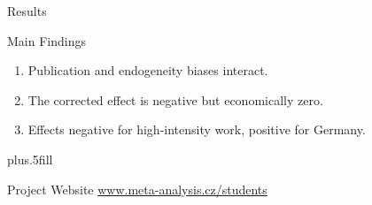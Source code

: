 \documentclass{beamer} %
\begin{document}
  
\begin{frame}{Results}
  \begin{block}{Main Findings}
  \begin{enumerate}
  \item
Publication and endogeneity biases interact.
\item
The corrected effect is negative but economically zero.
    \item
Effects negative for high-intensity work, positive for Germany.
  \end{enumerate}
  \end{block}

\vskip0pt plus.5fill
    \begin{block}{Project Website}
      \href{http://www.meta-analysis.cz/students}{www.meta-analysis.cz/students}
    \end{block}
\end{frame}
\end{document}
